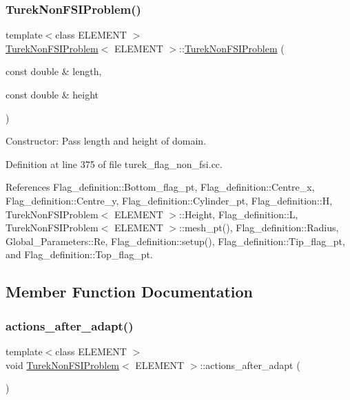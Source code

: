 \subsubsection{\texorpdfstring{Turek\+Non\+F\+S\+I\+Problem()}{TurekNonFSIProblem()}}
{\footnotesize\ttfamily template$<$class E\+L\+E\+M\+E\+NT $>$ \\
\hyperlink{classTurekNonFSIProblem}{Turek\+Non\+F\+S\+I\+Problem}$<$ E\+L\+E\+M\+E\+NT $>$\+::\hyperlink{classTurekNonFSIProblem}{Turek\+Non\+F\+S\+I\+Problem} (\begin{DoxyParamCaption}\item[{const double \&}]{length,  }\item[{const double \&}]{height }\end{DoxyParamCaption})}



Constructor\+: Pass length and height of domain. 



Definition at line 375 of file turek\+\_\+flag\+\_\+non\+\_\+fsi.\+cc.



References Flag\+\_\+definition\+::\+Bottom\+\_\+flag\+\_\+pt, Flag\+\_\+definition\+::\+Centre\+\_\+x, Flag\+\_\+definition\+::\+Centre\+\_\+y, Flag\+\_\+definition\+::\+Cylinder\+\_\+pt, Flag\+\_\+definition\+::H, Turek\+Non\+F\+S\+I\+Problem$<$ E\+L\+E\+M\+E\+N\+T $>$\+::\+Height, Flag\+\_\+definition\+::L, Turek\+Non\+F\+S\+I\+Problem$<$ E\+L\+E\+M\+E\+N\+T $>$\+::mesh\+\_\+pt(), Flag\+\_\+definition\+::\+Radius, Global\+\_\+\+Parameters\+::\+Re, Flag\+\_\+definition\+::setup(), Flag\+\_\+definition\+::\+Tip\+\_\+flag\+\_\+pt, and Flag\+\_\+definition\+::\+Top\+\_\+flag\+\_\+pt.



\subsection{Member Function Documentation}
\mbox{\label{classTurekNonFSIProblem_a88ed5ef8b1be34f5176c29ffec20eedd}} 
\subsubsection{\texorpdfstring{actions\+\_\+after\+\_\+adapt()}{actions\_after\_adapt()}}
{\footnotesize\ttfamily template$<$class E\+L\+E\+M\+E\+NT $>$ \\
void \hyperlink{classTurekNonFSIProblem}{Turek\+Non\+F\+S\+I\+Problem}$<$ E\+L\+E\+M\+E\+NT $>$\+::actions\+\_\+after\+\_\+adapt (\begin{DoxyParamCaption}{ }\end{DoxyParamCaption})}



